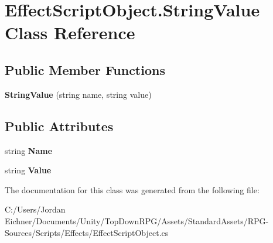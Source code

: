 \hypertarget{class_effect_script_object_1_1_string_value}{}\section{Effect\+Script\+Object.\+String\+Value Class Reference}
\label{class_effect_script_object_1_1_string_value}
\subsection*{Public Member Functions}
\begin{DoxyCompactItemize}
\item 
\hypertarget{class_effect_script_object_1_1_string_value_afc4b7dd444e28462edd5d2796d736b98}{}{\bfseries String\+Value} (string name, string value)\label{class_effect_script_object_1_1_string_value_afc4b7dd444e28462edd5d2796d736b98}

\end{DoxyCompactItemize}
\subsection*{Public Attributes}
\begin{DoxyCompactItemize}
\item 
\hypertarget{class_effect_script_object_1_1_string_value_ae654f4ac63b2a53d82b857b77e3c23ca}{}string {\bfseries Name}\label{class_effect_script_object_1_1_string_value_ae654f4ac63b2a53d82b857b77e3c23ca}

\item 
\hypertarget{class_effect_script_object_1_1_string_value_a14dc217e730e132de31929bc718dd2e6}{}string {\bfseries Value}\label{class_effect_script_object_1_1_string_value_a14dc217e730e132de31929bc718dd2e6}

\end{DoxyCompactItemize}


The documentation for this class was generated from the following file\+:\begin{DoxyCompactItemize}
\item 
C\+:/\+Users/\+Jordan Eichner/\+Documents/\+Unity/\+Top\+Down\+R\+P\+G/\+Assets/\+Standard\+Assets/\+R\+P\+G-\/\+Sources/\+Scripts/\+Effects/Effect\+Script\+Object.\+cs\end{DoxyCompactItemize}
